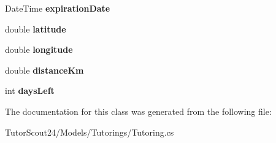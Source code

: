 \begin{DoxyCompactItemize}
\item 
\mbox{\label{class_tutor_scout24_1_1_models_1_1_tutorings_1_1_tutoring_a4a1bc61c4db859a967a2d94936694664}} 
Date\+Time {\bfseries expiration\+Date}
\item 
\mbox{\label{class_tutor_scout24_1_1_models_1_1_tutorings_1_1_tutoring_a97d74f7b9a28ae8507c75b390227297f}} 
double {\bfseries latitude}
\item 
\mbox{\label{class_tutor_scout24_1_1_models_1_1_tutorings_1_1_tutoring_aee0558a88106f3c3739ce041806b0c2f}} 
double {\bfseries longitude}
\item 
\mbox{\label{class_tutor_scout24_1_1_models_1_1_tutorings_1_1_tutoring_ae7f8b0584ed849f6da61ef73e59f66e1}} 
double {\bfseries distance\+Km}
\item 
\mbox{\label{class_tutor_scout24_1_1_models_1_1_tutorings_1_1_tutoring_a40ed8e1e113101f5e3569ef4782b0a05}} 
int {\bfseries days\+Left}
\end{DoxyCompactItemize}


The documentation for this class was generated from the following file\+:\begin{DoxyCompactItemize}
\item 
Tutor\+Scout24/\+Models/\+Tutorings/Tutoring.\+cs\end{DoxyCompactItemize}
